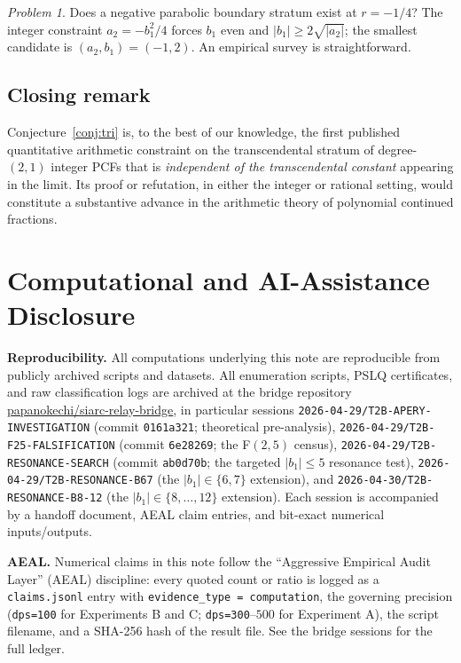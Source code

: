 \documentclass[11pt]{amsart}
\theoremstyle{definition}
\theoremstyle{remark}
\newtheorem{problem}{Problem}
\begin{document}
\begin{problem}\label{prob:negative-parabolic}
Does a negative parabolic boundary stratum exist at $r = -1/4$?
The integer constraint $a_2 = -b_1^2/4$ forces $b_1$ even and
$|b_1| \ge 2\sqrt{|a_2|}$; the smallest candidate is
$(a_2, b_1) = (-1, 2)$.  An empirical survey is straightforward.
\end{problem}

\subsection*{Closing remark}
Conjecture~\ref{conj:tri} is, to the best of our knowledge, the
first published quantitative arithmetic constraint on the
transcendental stratum of degree-$(2,1)$ integer PCFs that is
\emph{independent of the transcendental constant} appearing in the
limit.  Its proof or refutation, in either the integer or rational
setting, would constitute a substantive advance in the
arithmetic theory of polynomial continued fractions.

\section*{Computational and AI-Assistance Disclosure}

\textbf{Reproducibility.}  All computations underlying this note are
reproducible from publicly archived scripts and datasets.  All
enumeration scripts, PSLQ certificates, and raw classification logs
are archived at the bridge repository
\href{https://github.com/papanokechi/siarc-relay-bridge}%
{papanokechi/siarc-relay-bridge}, in particular sessions
\texttt{2026-04-29/T2B-APERY-INVESTIGATION} (commit
\texttt{0161a321}; theoretical pre-analysis),
\texttt{2026-04-29/T2B-F25-FALSIFICATION} (commit
\texttt{6e28269}; the F$(2,5)$ census),
\texttt{2026-04-29/T2B-RESONANCE-SEARCH} (commit
\texttt{ab0d70b}; the targeted $|b_1| \le 5$ resonance test),
\texttt{2026-04-29/T2B-RESONANCE-B67} (the $|b_1| \in \{6,7\}$
extension), and \texttt{2026-04-30/T2B-RESONANCE-B8-12} (the
$|b_1| \in \{8,\ldots,12\}$ extension).  Each session is accompanied
by a handoff document, AEAL claim entries, and bit-exact numerical
inputs/outputs.

\textbf{AEAL.}  Numerical claims in this note follow the
``Aggressive Empirical Audit Layer'' (AEAL) discipline: every quoted
count or ratio is logged as a \texttt{claims.jsonl} entry with
\texttt{evidence\_type = computation}, the
governing precision (\texttt{dps=100} for Experiments B and C;
\texttt{dps=300}--$500$ for Experiment A), the script filename,
and a SHA-256 hash of the result file.  See the bridge sessions for
the full ledger.
\end{document}
